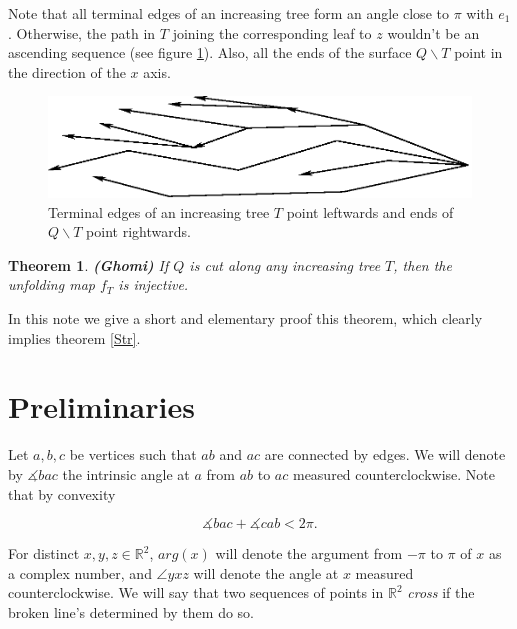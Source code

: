 \documentclass[openright, 12pt]{article}
\newtheorem{teorema}{Theorem}
\newcommand{\field}[1]{\ensuremath{\mathbb{#1}}}
\newcommand{\R}{\field{R}}
\begin{document}
Note that all terminal edges of an increasing tree form an angle close to $\pi$ with $e_1$. Otherwise, the path in $T$ joining the corresponding leaf to $z$ wouldn't be an ascending sequence (see figure \ref{Mon}). Also, all the ends of the surface $Q \backslash T$ point in the direction of the $x$ axis.




\begin{figure}[h]
\centering
\includegraphics[scale=0.84]{Mono2.eps}
\caption{Terminal edges of an increasing tree $T$ point leftwards and ends of $Q \backslash T$ point rightwards.}\label{Mon}
\end{figure}




\begin{teorema}\label{Gho}
{\rm \textbf{(Ghomi)} If $Q$ is cut along any increasing tree $T$, then the unfolding map $f_T$ is injective.}
\end{teorema}



In this note we give a short and elementary proof this theorem, which clearly implies theorem \ref{Str}. 


\section*{Preliminaries}




Let $a, b, c$ be vertices such that $ab $ and $ac$ are connected by edges. We will denote by $\measuredangle bac $ the intrinsic angle at $a $ from $ab$ to $ac$ measured counterclockwise. Note that by convexity

\begin{equation}\label{Alex}
\measuredangle bac + \measuredangle  cab  < 2\pi.
\end{equation} 

For distinct $x,y,z \in \R^2$, $arg (x)$ will denote the argument from $-\pi$ to $\pi$ of $x$ as a complex number, and $\angle yxz $ will denote the angle at $x$ measured counterclockwise. We will say that two sequences of points in $\R ^2$ \textit{cross} if the broken line's determined by them do so. 
 
\end{document}
